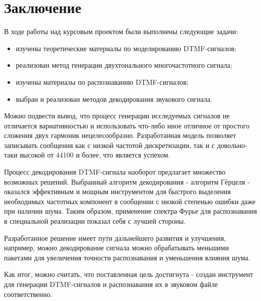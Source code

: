 \chapter*{Заключение} \label{ch-conclusion}

В ходе работы над курсовым проектом были выполнены следующие задачи:

\begin{itemize}
	\item изучены теоретические материалы по моделированию DTMF-сигналов;
	\item реализован метод генерации двухтонального многочастотного сигнала;
	\item изучены материалы по распознаванию DTMF-сигналов;
	\item выбран и реализован методов декодирования звукового сигнала.
\end{itemize} 

Можно подвести вывод, что процесс генерации исследуемых сигналов не отличается вариативностью и использовать что-либо иное отличное от простого сложения двух гармоник нецелесообразно. Разработанная модель позволяет записывать сообщения как с низкой частотой дискретизации, так и с довольно-таки высокой от 44100 и более, что является успехом.

Процесс декодирования DTMF-сигнала наоборот предлагает множество возможных решений. Выбранный алгоритм декодирования - алгоритм Гёрцеля - оказался эффективным и мощным инструментом для быстрого выделения необходимых частотных компонент в сообщении с низкой степенью ошибки даже при наличии шума. Таким образом, применение спектра Фурье для распознавания в специальной реализации показал себя с лучшей стороны.

Разработанное решение имеет пути дальнейшего развития и улучшения, например, можно декодирование сигнала можно обрабатывать меньшими пакетами для увеличения точности распознавания и уменьшения влияния шума.
 
Как итог, можно считать, что поставленная цель достигнута - создан инструмент для генерации DTMF-сигналов и распознавания их в звуковом файле соответственно.
